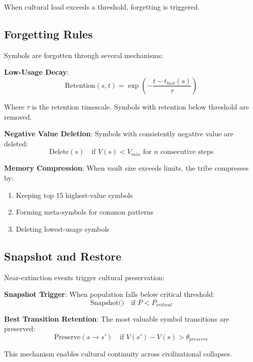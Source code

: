 \documentclass[11pt,a4paper]{article}
\begin{document}
When cultural load exceeds a threshold, forgetting is triggered.

\subsection{Forgetting Rules}

Symbols are forgotten through several mechanisms:

\textbf{Low-Usage Decay}:
\begin{equation}
\text{Retention}(s, t) = \exp\left(-\frac{t - t_{last}(s)}{\tau}\right)
\end{equation}

Where $\tau$ is the retention timescale. Symbols with retention below threshold are removed.

\textbf{Negative Value Deletion}: Symbols with consistently negative value are deleted:
\begin{equation}
\text{Delete}(s) \quad \text{if } V(s) < V_{min} \text{ for } n \text{ consecutive steps}
\end{equation}

\textbf{Memory Compression}: When vault size exceeds limits, the tribe compresses by:
\begin{enumerate}
    \item Keeping top 15 highest-value symbols
    \item Forming meta-symbols for common patterns
    \item Deleting lowest-usage symbols
\end{enumerate}

\subsection{Snapshot and Restore}

Near-extinction events trigger cultural preservation:

\textbf{Snapshot Trigger}: When population falls below critical threshold:
\begin{equation}
\text{Snapshot()} \quad \text{if } P < P_{critical}
\end{equation}

\textbf{Best Transition Retention}: The most valuable symbol transitions are preserved:
\begin{equation}
\text{Preserve}(s \rightarrow s') \quad \text{if } V(s') - V(s) > \theta_{preserve}
\end{equation}

This mechanism enables cultural continuity across civilizational collapses.
\end{document}
